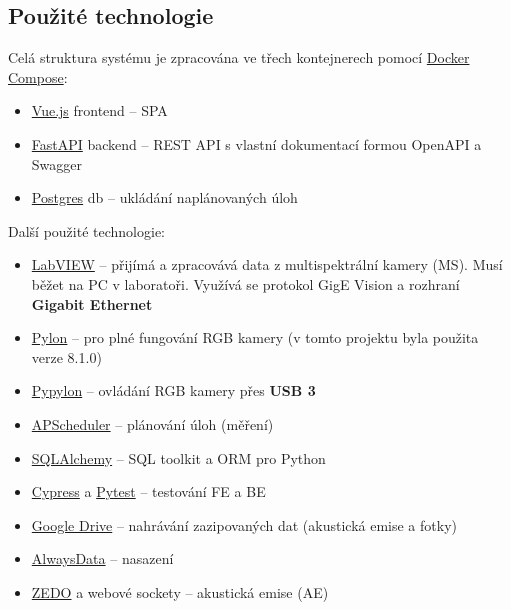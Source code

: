 \documentclass[12pt]{article}
\begin{document}
\begin{teamwork}
        \subsection{Použité technologie}\label{subsec:techstack}

        Celá struktura systému je zpracována ve třech kontejnerech pomocí \href{https://docs.docker.com/compose/}{Docker Compose}:

        \begin{itemize}
            \item \href{https://vuejs.org/}{Vue.js} frontend – SPA
            \item \href{https://fastapi.tiangolo.com/}{FastAPI} backend – REST API s vlastní dokumentací formou OpenAPI a Swagger
            \item \href{https://www.postgresql.org/}{Postgres} db – ukládání naplánovaných úloh
        \end{itemize}

        Další použité technologie:

        \begin{itemize}
            \item \href{https://www.ni.com/en/shop/labview.html}{LabVIEW} – přijímá a zpracovává data z multispektrální kamery (MS). Musí běžet na PC v laboratoři.
            Využívá se protokol GigE Vision a rozhraní \textbf{Gigabit Ethernet}
            \item \href{https://www.baslerweb.com/en/downloads/software/?downloadCategory.values.label.data=pylon}{Pylon} – pro plné fungování RGB kamery (v tomto projektu byla použita verze 8.1.0)
            \item \href{https://github.com/basler/pypylon}{Pypylon} – ovládání RGB kamery přes \textbf{USB 3}
            \item \href{https://github.com/agronholm/apscheduler}{APScheduler} – plánování úloh (měření)
            \item \href{https://www.sqlalchemy.org/}{SQLAlchemy} – SQL toolkit a ORM pro Python
            \item \href{https://www.cypress.io/}{Cypress} a \href{https://docs.pytest.org/en/stable/}{Pytest} – testování FE a BE
            \item \href{https://workspace.google.com/products/drive/}{Google Drive} – nahrávání zazipovaných dat (akustická emise a fotky)
            \item \href{https://www.alwaysdata.com/en/}{AlwaysData} – nasazení
            \item \href{http://dakel.cz/index.php?pg=prod/dev/zedo_en}{ZEDO} a webové sockety – akustická emise (AE)
        \end{itemize}


\end{teamwork}
\end{document}

